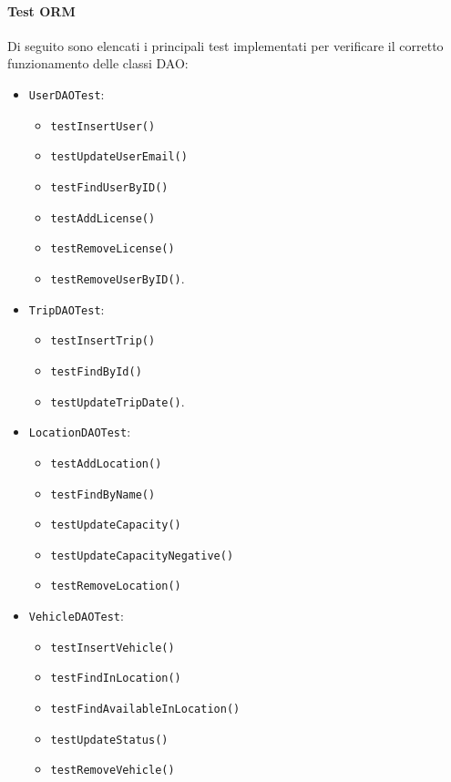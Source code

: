 \paragraph{Test ORM}
Di seguito sono elencati i principali test implementati per verificare il corretto funzionamento delle classi DAO:
\begin{itemize}
    \item \texttt{UserDAOTest}: 
    \begin{itemize}
        \item \texttt{testInsertUser()}
        \item \texttt{testUpdateUserEmail()} 
        \item \texttt{testFindUserByID()}
        \item \texttt{testAddLicense()}
        \item \texttt{testRemoveLicense()}
        \item \texttt{testRemoveUserByID()}.
    \end{itemize}
    
    
    \item \texttt{TripDAOTest}: 
    \begin{itemize}
        \item \texttt{testInsertTrip()}
        \item \texttt{testFindById()}
        \item \texttt{testUpdateTripDate()}.
    \end{itemize}
    
    
    \item \texttt{LocationDAOTest}: 
    \begin{itemize}
        \item \texttt{testAddLocation()}
        \item \texttt{testFindByName()}
        \item \texttt{testUpdateCapacity()}
        \item \texttt{testUpdateCapacityNegative()}
        \item \texttt{testRemoveLocation()}
    \end{itemize}
    
    \item \texttt{VehicleDAOTest}: 
    \begin{itemize}
        \item \texttt{testInsertVehicle()}
        \item \texttt{testFindInLocation()}
        \item \texttt{testFindAvailableInLocation()}
        \item \texttt{testUpdateStatus()}
        \item \texttt{testRemoveVehicle()}
    \end{itemize}
\end{itemize}

